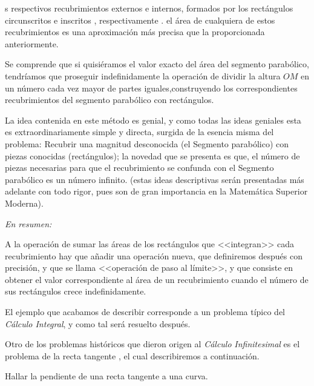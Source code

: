 \begin{solucion}
s respectivos recubrimientos externos e internos, formados por los
rectángulos circunscritos e inscritos , respectivamente . el área
de cualquiera de estos recubrimientos es una aproximación más precisa
que la proporcionada anteriormente.

Se comprende que si quisiéramos el valor exacto del área del segmento
parabólico, tendríamos que proseguir indefinidamente la operación
de dividir la altura $OM$ en un número cada vez mayor de partes iguales,construyendo
los correspondientes recubrimientos del segmento parabólico con rectángulos.

\end{solucion}

La idea contenida en este método es genial, y como todas las ideas
geniales esta es extraordinariamente simple y directa, surgida de
la esencia misma del problema: Recubrir una magnitud desconocida (el
Segmento parabólico) con piezas conocidas (rectángulos); la novedad
que se presenta es que, el número de piezas necesarias para que el
recubrimiento se confunda con el Segmento parabólico es un número
infinito. (estas ideas descriptivas serán presentadas más adelante
con todo rigor, pues son de gran importancia en la Matemática Superior
Moderna). 

\begin{resumen}\peque

\textsl{En resumen:}

A la operación de sumar las áreas de los rectángulos que <<integran>>
cada recubrimiento hay que añadir una operación nueva, que definiremos
después con precisión, y que se llama <<operación de paso al límite>>,
y que consiste en obtener el valor correspondiente al área de un recubrimiento
cuando el número de sus rectángulos crece indefinidamente.

\end{resumen}

El ejemplo que acabamos de describir corresponde a un problema típico
del \textsl{Cálculo Integral}, y como tal será resuelto después.

Otro de los problemas históricos que dieron origen al \textsl{Cálculo}
\textsl{Infinitesimal }es el problema de la recta tangente , el cual
describiremos a continuación.

\begin{problema}\label{prob:pro2} 

Hallar la pendiente de una recta tangente a una curva.

\end{problema}

